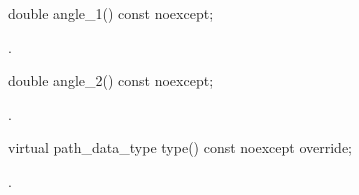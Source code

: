 \begin{itemdecl}
    double angle_1() const noexcept;
\end{itemdecl}
\begin{itemdescr}
	\pnum
	\returns
	.

\end{itemdescr}

\begin{itemdecl}
    double angle_2() const noexcept;
\end{itemdecl}
\begin{itemdescr}
	\pnum
	\returns
	.

\end{itemdescr}

\begin{itemdecl}
    virtual path_data_type type() const noexcept override;
\end{itemdecl}
\begin{itemdescr}
	\pnum
	\returns
	.

\end{itemdescr}
